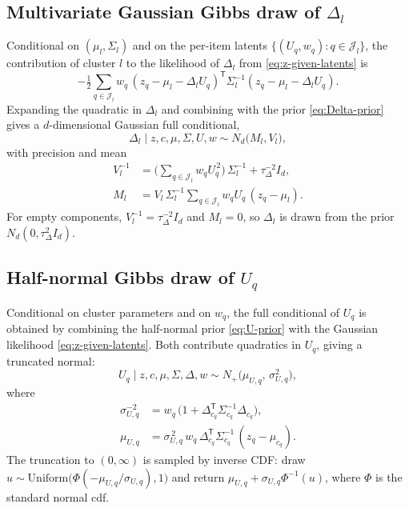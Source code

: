 \documentclass[11pt]{article}
\newcommand{\trans}{^{\mathsf T}}
\begin{document}
\subsection{Multivariate Gaussian Gibbs draw of $\Delta_l$}

Conditional on $(\mu_l,\Sigma_l)$ and on the per-item latents
$\{(U_q,w_q):q\in\mathcal J_l\}$, the contribution of cluster $l$ to the
likelihood of $\Delta_l$ from \eqref{eq:z-given-latents} is
\begin{equation}
    -\tfrac{1}{2}\sum_{q\in\mathcal J_l}w_q\,
    (z_q-\mu_l-\Delta_l U_q)\trans\Sigma_l^{-1}(z_q-\mu_l-\Delta_l U_q).
    \label{eq:Delta-likelihood}
\end{equation}
Expanding the quadratic in $\Delta_l$ and combining with the prior
\eqref{eq:Delta-prior} gives a $d$-dimensional Gaussian full conditional,
\begin{equation}
    \Delta_l\mid z,c,\mu,\Sigma,U,w
    \sim
    N_d\!\bigl(M_l,V_l\bigr),
    \label{eq:Delta-post}
\end{equation}
with precision and mean
\begin{align}
    V_l^{-1}
    &=
    \biggl(\sum_{q\in\mathcal J_l}w_q U_q^{\,2}\biggr)\,\Sigma_l^{-1}
    +\tau_\Delta^{-2}I_d,
    \label{eq:Delta-prec}\\
    M_l
    &=
    V_l\,\Sigma_l^{-1}\sum_{q\in\mathcal J_l}
    w_q U_q\,(z_q-\mu_l).
    \label{eq:Delta-mean}
\end{align}
For empty components, $V_l^{-1}=\tau_\Delta^{-2}I_d$ and $M_l=0$, so
$\Delta_l$ is drawn from the prior $N_d(0,\tau_\Delta^2 I_d)$.

\subsection{Half-normal Gibbs draw of $U_q$}

Conditional on cluster parameters and on $w_q$, the full conditional of
$U_q$ is obtained by combining the half-normal prior \eqref{eq:U-prior}
with the Gaussian likelihood \eqref{eq:z-given-latents}.  Both contribute
quadratics in $U_q$, giving a truncated normal:
\begin{equation}
    U_q\mid z,c,\mu,\Sigma,\Delta,w
    \sim
    N_+\!\bigl(\mu_{U,q},\,\sigma_{U,q}^{2}\bigr),
    \label{eq:U-post}
\end{equation}
where
\begin{align}
    \sigma_{U,q}^{-2}
    &=
    w_q\,\bigl(1+\Delta_{c_q}\trans\Sigma_{c_q}^{-1}\Delta_{c_q}\bigr),
    \label{eq:U-prec}\\
    \mu_{U,q}
    &=
    \sigma_{U,q}^{\,2}\,w_q\,
    \Delta_{c_q}\trans\Sigma_{c_q}^{-1}\,(z_q-\mu_{c_q}).
    \label{eq:U-mean}
\end{align}
The truncation to $(0,\infty)$ is sampled by inverse CDF: draw
$u\sim\mathrm{Uniform}\!\bigl(\Phi(-\mu_{U,q}/\sigma_{U,q}),1\bigr)$ and
return $\mu_{U,q}+\sigma_{U,q}\Phi^{-1}(u)$, where $\Phi$ is the standard
normal cdf.
\end{document}
